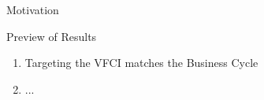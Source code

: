 \begin{frame}{Motivation}

\end{frame}


\begin{frame}{Preview of Results}

  \begin{enumerate}
    \item Targeting the VFCI matches the Business Cycle
    \item ...
  \end{enumerate}

\end{frame}